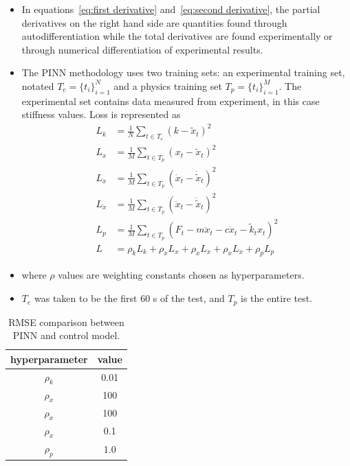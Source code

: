 \documentclass[letterpaper]{article}\usepackage{mathtools,amssymb,latexsym,graphics,enumerate}
\numberwithin{equation}{section}
\newcommand{\pa}{\partial}
\newcommand{\lf}{\left}
\newcommand{\rg}{\right}
\numberwithin{remark}{section}
\numberwithin{lem}{section}
\begin{document}
\begin{itemize}
\begin{equation}
		\end{equation}
		\begin{equation}
			\label{eq:second derivative}
			\frac{d^2\phi_i}{dt^2} = \frac{\pa^2\phi_i}{\pa t^2} + \sum_{j=1}^3\lf(2\frac{\pa^2\phi_i}{\pa t\pa \psi_j}\frac{d\psi_j}{dt}+ \frac{\pa \phi_i}{\pa \psi_j}\frac{d^2\psi_j}{dt^2}\rg) + \sum_{j=1}^3\sum_{k=1}^3\frac{\pa^2 \phi_i}{\pa\psi_j\pa\psi_k}\frac{d\psi_j}{dt}\frac{d\psi_k}{dt}
		\end{equation}
		\item In equations~\ref{eq:first derivative} and~\ref{eq:second derivative}, the partial derivatives on the right hand side are quantities found through autodifferentiation while the total derivatives are found experimentally or through numerical differentiation of experimental results.
		\item The PINN methodology uses two training sets: an experimental training set, notated $T_e=\{t_i\}_{i=1}^N$ and a physics training set $T_p=\{t_i\}_{i=1}^M$. The experimental set contains data measured from experiment, in this case stiffness values. Loss is represented as
		\begin{align}
			L_k &= \frac1N\sum_{t\in T_e}\lf(k - \tilde{x}_t\rg)^2\\
			L_x &= \frac1M \sum_{t\in T_p}\lf(x_t - \tilde{x}_t\rg)^2\\
			L_{\dot{x}} &= \frac1M\sum_{t\in T_p}\lf(\dot{x}_t - \dot{\tilde{x}}_t\rg)^2\\
			L_{\ddot{x}} &= \frac1M\sum_{t\in T_p}\lf(\ddot{x}_t - \ddot{\tilde{x}}_t\rg)^2\\
			L_p &= \frac1M\sum_{t\in T_p}\lf(F_t - m\ddot{x}_t - c\dot{x}_t - \tilde{k}_tx_t\rg)^2\\
			L &= \rho_kL_k + \rho_xL_x + \rho_{\dot{x}}L_{\dot{x}} + \rho_{\ddot{x}}L_{\ddot{x}} + \rho_pL_p
		\end{align}
		\item where $\rho$ values are weighting constants chosen as hyperparameters. 
		\item $T_e$ was taken to be the first 60 s of the test, and $T_p$ is the entire test.
	\end{itemize}
	\begin{table}[H]
		\label{tab:rho vals}
		\caption{RMSE comparison between PINN and control model.}
		\begin{center}
			\begin{tabular}{c c}
				hyperparameter & value \\\hline
				$\rho_k$ & 0.01 \\
				$\rho_x$ & 100 \\
				$\rho_{\dot x}$ & 100 \\
				$\rho_{\ddot x}$ & 0.1 \\
				$\rho_{p}$ & 1.0 \\
			\end{tabular}
		\end{center}
	\end{table}
\end{document}
